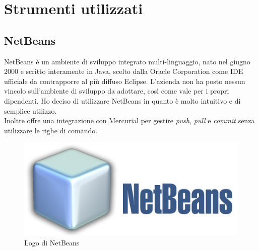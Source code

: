 \section{Strumenti utilizzati}
\subsection{NetBeans}
NetBeans è un ambiente di sviluppo integrato multi-linguaggio, nato nel giugno 2000 e scritto interamente in Java, scelto dalla Oracle Corporation come IDE ufficiale da contrapporre al più diffuso Eclipse.
L'azienda non ha posto nessun vincolo sull'ambiente di sviluppo da adottare, così come vale per i propri dipendenti. Ho deciso di utilizzare NetBeans in quanto è molto intuitivo e di semplice utilizzo.\\
Inoltre offre una integrazione con \gls{Mercurial} per gestire \emph{push}, \emph{pull} e \emph{commit} senza utilizzare le righe di comando.
\begin{figure}[h]
	\centering
	\includegraphics[scale=0.4]{../Immagini/netbeans.jpg}
	\caption{Logo di NetBeans}
\end{figure}
